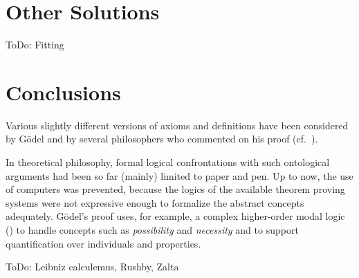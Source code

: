 \documentclass{birkjour}
\newtheorem{thm}{Theorem}[section]
\theoremstyle{definition}
\newtheorem{defn}[thm]{Definition}
\theoremstyle{remark}
\numberwithin{equation}{section}
\def\HOML{\entity{HOML}\xspace}
\begin{document}
\clearpage

\section{Other Solutions}

ToDo: Fitting


\section{Conclusions}


Various slightly different versions of
axioms and definitions have been considered by G\"{o}del and by
several philosophers who commented on his proof
(cf.~\cite{sobel2004logic,anderson90:_some_emend_of_goedel_ontol_proof,AndersonGettings,Fitting,Adams,ContemporaryBibliography}).



In theoretical philosophy, formal logical confrontations with such
ontological arguments had been so far (mainly) limited to paper
and pen.  Up to now, the use of computers was prevented, because the
logics of the available theorem proving systems were not expressive
enough to formalize the abstract concepts adequately. G{\"o}del's proof
uses, for example, a complex higher-order modal logic (\HOML) to handle
concepts such as \emph{possibility} and \emph{necessity} and to support
quantification over individuals and properties.



ToDo: Leibniz calculemus, Rushby, Zalta \cite{oppenheimera11,rushby13}





\end{document}
